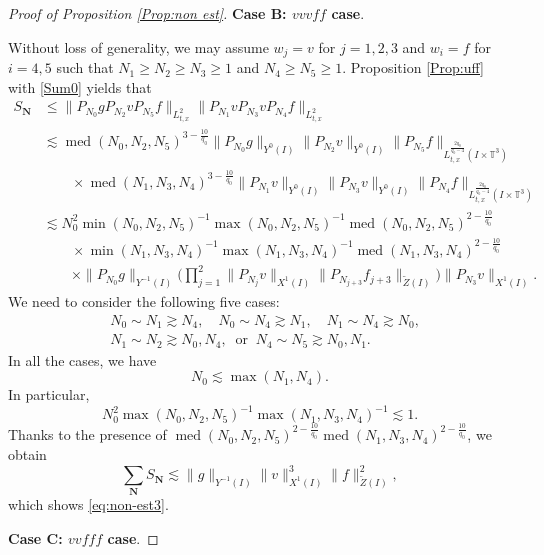 \documentclass[letterpaper, 11pt,  reqno]{amsart}
\DeclareMathOperator{\med}{med}
\newcommand{\1}{\hspace{0.5mm}\text{I}\hspace{0.5mm}}
\newcommand{\noi}{\noindent}
\newcommand{\T}{\mathbb{T}}
\newcommand{\wt}{\widetilde}
\newcommand{\les}{\lesssim}
\newcommand{\ges}{\gtrsim}
\newcommand{\Nb}{\mathbf{N}}
\numberwithin{equation}{section}
\numberwithin{theorem}{section}
\begin{document}
\begin{proof}[Proof of Proposition \ref{Prop:non est}]
\medskip
\noi
{\bf Case B: $vvvff$ case}. 
\smallskip

Without loss of generality, we may
assume $w_j=v$
 for $j=1,2,3$
and $w_i=f$ for $i=4,5$
such that $N_1\geq N_2\geq N_3\geq 1$ and $N_4\geq N_5\geq 1$. 
Proposition \ref{Prop:uff} with  \eqref{Sum0} yields that
\begin{align*}
S_{\Nb}
&\le
\|P_{N_0}g P_{N_2}v P_{N_5}f\|_{L_{t,x}^2}
\|P_{N_1}v P_{N_3}v P_{N_4}f\|_{L_{t,x}^2}
\\
&\les
\med(N_0,N_2,N_5)^{3-\frac{10}{q_0}}
\|P_{N_0}g\|_{Y^0(I)}
\|P_{N_2}v\|_{Y^0(I)}
\|P_{N_5}f\|_{L_{t,x}^{\frac{2q_0}{q_0-4}}(I \times \T^3)}
\\
&\qquad
\times
\med(N_1,N_3,N_4)^{3-\frac{10}{q_0}}
\|P_{N_1}v\|_{Y^0(I)}
\|P_{N_3}v\|_{Y^0(I)}
\|P_{N_4}f\|_{L_{t,x}^{\frac{2q_0}{q_0-4}}(I \times \T^3)}
\\
&\les
N_0^2
\min(N_0,N_2,N_5)^{-1}
\max(N_0,N_2,N_5)^{-1}
\med(N_0,N_2,N_5)^{2-\frac{10}{q_0}}
\\
&\qquad
\times
\min(N_1,N_3,N_4)^{-1}
\max(N_1,N_3,N_4)^{-1}
\med(N_1,N_3,N_4)^{2-\frac{10}{q_0}}
\\
&\qquad
\times
\|P_{N_0} g \|_{Y^{-1}(I)}
\bigg(
\prod_{j=1}^2 \| P_{N_j} v \|_{X^1(I)}
\| P_{N_{j+3}} f_{j+3} \|_{\wt Z(I)}
\bigg)
\| P_{N_3} v \|_{X^1(I)}
.
\end{align*}
We need to consider the following five cases:
\[
\begin{aligned}
&N_0 \sim N_1 \ges N_4, \quad
N_0 \sim N_4 \ges N_1, \quad
N_1 \sim N_4 \ges N_0, \\
&N_1 \sim N_2 \ges N_0, N_4, \
\text{ or } \
N_4 \sim N_5 \ges N_0, N_1.
\end{aligned}
\]
In all the cases,
we have
\[
N_0 \les
\max (N_1,N_4)
.
\]
In particular,
\[
N_0^2
\max(N_0,N_2,N_5)^{-1}
\max(N_1,N_3,N_4)^{-1}
\les 1.
\]
Thanks to the presence of
$\med(N_0,N_2,N_5)^{2-\frac{10}{q_0}} \med(N_1,N_3,N_4)^{2-\frac{10}{q_0}}$,
we obtain
\[
\sum_{\Nb} S_\Nb
\les
\|g\|_{Y^{-1}(I)}
\| v \|_{X^1(I)}^3
\| f \|_{\wt Z(I)}^2,
\]
which shows  \eqref{eq:non-est3}.


\medskip
\noi
{\bf Case C: $vvfff$ case}. 
\smallskip


\end{proof}
\end{document}
